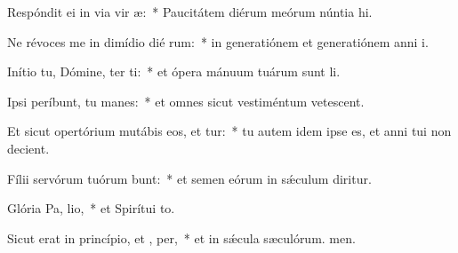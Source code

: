 \item Respóndit ei in via vir æ:~* Paucitátem diérum meórum núntia hi.
\item Ne révoces me in dimídio dié rum:~* in generatiónem et generatiónem anni i.
\item Inítio tu, Dómine, ter ti:~* et ópera mánuum tuárum sunt li.
\item Ipsi períbunt, tu  manes:~* et omnes sicut vestiméntum vetescent.
\item Et sicut opertórium mutábis eos, et tur:~* tu autem idem ipse es, et anni tui non decient.
\item Fílii servórum tuórum bunt:~* et semen eórum in sǽculum diritur.
\item Glória Pa,  lio,~* et Spirítui to.
\item Sicut erat in princípio, et ,  per,~* et in sǽcula sæculórum. men.
